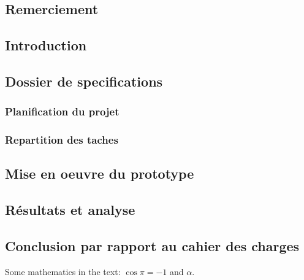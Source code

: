 
\subsection{Remerciement}

\subsection{Introduction}

\subsection{Dossier de specifications}

\subsubsection{Planification du projet}
\subsubsection{Repartition des taches}
\subsection{Mise en oeuvre du prototype}
\subsection{Résultats et analyse}
\subsection{Conclusion par rapport au cahier des charges}


\lipsum[1-3] %
Some mathematics in the text: $\cos\pi=-1$ and $\alpha$.